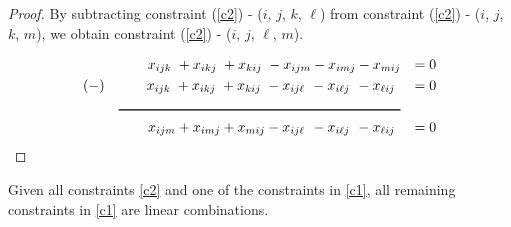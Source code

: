 \begin{proof}
	By subtracting constraint (\ref{c2}) - ($i$, $j$, $k$, $\ell$) from constraint (\ref{c2}) - ($i$, $j$, $k$, $m$), we obtain constraint (\ref{c2}) - ($i$, $j$, $\ell$, $m$).
	
	\begin{align*}
	& &x_{ijk}\hspace{3 pt} + x_{ikj}\hspace{3 pt} + x_{kij}\hspace{3 pt} - x_{ijm} - x_{imj} - x_{mij} &&= 0 \\
	&(-) &x_{ijk}\hspace{3 pt} + x_{ikj}\hspace{3 pt} + x_{kij}\hspace{3 pt} - x_{ij\ell}\hspace{4 pt} - x_{i\ell j}\hspace{4 pt} - x_{\ell ij} \hspace{4 pt} &&= 0 \\
	& &\rule{7,1 cm}{1 pt} &&\\
	& &x_{ijm} + x_{imj} + x_{mij} - x_{ij\ell}\hspace{4 pt} - x_{i\ell j}\hspace{4 pt} - x_{\ell ij} \hspace{4 pt} &&= 0
	\end{align*}
\end{proof}

\begin{lemma}
	Given all constraints \ref{c2} and one of the constraints in \ref{c1}, all remaining constraints in \ref{c1} are linear combinations.
\end{lemma}

